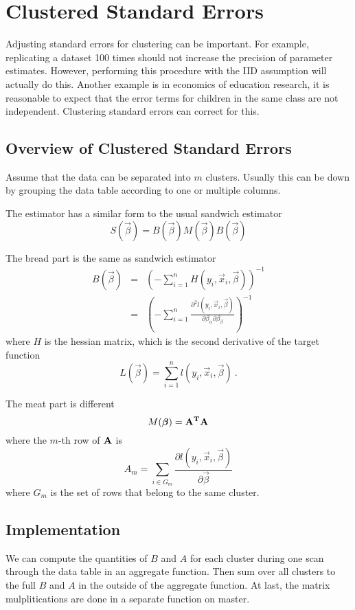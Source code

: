
\section{Clustered Standard Errors} %
\label{sec:clustered_standard_errors}
Adjusting standard errors for clustering can be important. For
example, replicating a dataset 100 times should not increase the
precision of parameter estimates. However, performing this procedure
with the IID assumption will actually do this. Another example is in
economics of education research, it is reasonable to expect that the
error terms for children in the same class are not
independent. Clustering standard errors can correct for this.

\subsection{Overview of Clustered Standard Errors}

Assume that the data can be separated into $m$ clusters. Usually this
can be down by grouping the data table according to one or multiple
columns.

The estimator has a similar form to the usual sandwich estimator
\begin{equation}
  S(\vec{\beta}) = B(\vec{\beta}) M(\vec{\beta}) B(\vec{\beta})
\end{equation}

The bread part is the same as sandwich estimator
\begin{eqnarray}
  B(\vec{\beta}) & = & \left(-\sum_{i=1}^{n} H(y_i, \vec{x}_i,
    \vec{\beta})\right)^{-1}\\
  & = & \left(-\sum_{i=1}^{n}\frac{\partial^2 l(y_i, \vec{x}_i,
      \vec{\beta})}{\partial \beta_\alpha \partial \beta_\beta}\right)^{-1}
\end{eqnarray}
where $H$ is the hessian matrix, which is the second derivative of the
target function
\begin{equation}
  L(\vec{\beta}) = \sum_{i=1}^n l(y_i, \vec{x}_i, \vec{\beta})\ .
\end{equation}

The meat part is different
\begin{equation}
  M(\vec{\beta}) = \bf{A}^T\bf{A}
\end{equation}
where the $m$-th row of $\bf{A}$ is
\begin{equation}
  A_m = \sum_{i\in G_m}\frac{\partial
      l(y_i,\vec{x}_i,\vec{\beta})}{\partial \vec{\beta}}
\end{equation}
where $G_m$ is the set of rows that belong to the same cluster.

\subsection{Implementation}

We can compute the quantities of $B$ and $A$ for each cluster during one scan
through the data table in an aggregate function. Then sum over all clusters to
the full $B$ and $A$ in the outside of the aggregate function. At last, the
matrix mulplitications are done in a separate function on master.
